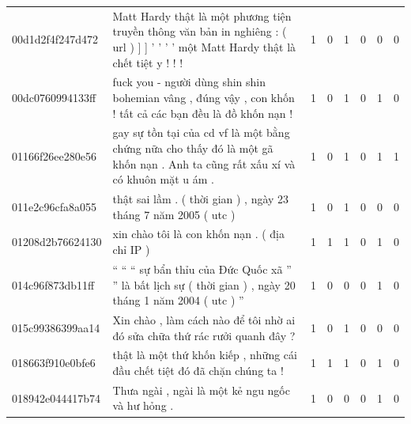 \begin{table}[htb]
{\begin{minipage}{\textheight}
\begin{threeparttable}
\begin{tabularx}{\textwidth}{L{0.8} L{6.6} C{0.1} C{0.1} C{0.1} C{0.1} C{0.1} C{0.1}}
                    00d1d2f4f247d472 & Matt Hardy thật là một phương tiện truyền thông văn bản in nghiêng : ( url ) ] ] ' ' ' ' một Matt Hardy thật là chết tiệt y ! ! ! & 1           & 0           & 1           & 0           & 0           & 0           \\
                    00dc0760994133ff & fuck you - người dùng shin shin bohemian vâng , đúng vậy , con khốn ! tất cả các bạn đều là đồ khốn nạn !                         & 1           & 0           & 1           & 0           & 1           & 0           \\
                    01166f26ee280e56 & gay sự tồn tại của cd vf là một bằng chứng nữa cho thấy đó là một gã khốn nạn . Anh ta cũng rất xấu xí và có khuôn mặt u ám .     & 1           & 0           & 1           & 0           & 1           & 1           \\
                    011e2c96cfa8a055 & thật sai lầm . ( thời gian ) , ngày 23 tháng 7 năm 2005 ( utc )                                                                   & 1           & 0           & 1           & 0           & 0           & 0           \\
                    01208d2b76624130 & xin chào tôi là con khốn nạn . ( địa chỉ IP )                                                                                     & 1           & 1           & 1           & 0           & 1           & 0           \\
                    014c96f873db11ff & `` `` `` sự bẩn thỉu của Đức Quốc xã '' '' là bất lịch sự ( thời gian ) , ngày 20 tháng 1 năm 2004 ( utc ) ''                     & 1           & 0           & 0           & 0           & 1           & 0           \\
                    015c99386399aa14 & Xin chào , làm cách nào để tôi nhờ ai đó sửa chữa thứ rác rưởi quanh đây ?                                                        & 1           & 0           & 1           & 0           & 0           & 0           \\
                    018663f910e0bfe6 & thật là một thứ khốn kiếp , những cái đầu chết tiệt đó đã chặn chúng ta !                                                         & 1           & 1           & 1           & 0           & 1           & 0           \\
                    018942e044417b74 & Thưa ngài , ngài là một kẻ ngu ngốc và hư hỏng .                                                                                  & 1           & 0           & 0           & 0           & 1           & 0           \\

\end{tabularx}
\end{threeparttable}
\end{minipage}}
\end{table}

